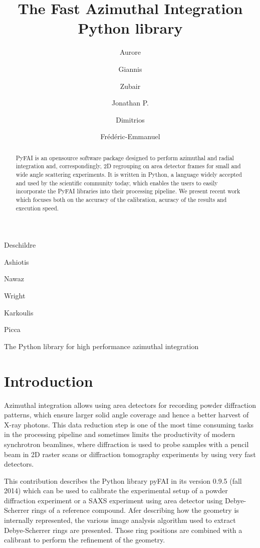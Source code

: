 \documentclass[preprint]{iucr}
\begin{document}
\title{The Fast Azimuthal Integration Python library}

    \author[a]{Aurore}{Deschildre}
    \author[a]{Giannis}{Ashiotis}
    \author[b]{Zubair}{Nawaz}
    \author[a]{Jonathan P.}{Wright}
    \author[a]{Dimitrios}{Karkoulis}
    \author[c]{Fr\'ed\'eric-Emmanuel}{Picca}

\maketitle

\begin{synopsis}
The Python library for high performance azimuthal integration 
\end{synopsis}

\begin{abstract}
PyFAI is an opensource software package designed to perform azimuthal and radial integration and,
correspondingly, 2D regrouping on area detector frames for small and wide
angle scattering experiments. 
It is written in Python, a
language widely accepted and used by the scientific community today, which enables the users to easily incorporate the PyFAI libraries into their processing pipeline. We present recent work
which focuses both on the accuracy of the calibration, acuracy of the results
and execution speed.
\end{abstract}

\section{Introduction}
Azimuthal integration allows using area detectors for recording powder
diffraction patterns, which  ensure larger solid angle coverage and hence a
better harvest of X­-ray photons.
This data reduction 
step is one of the most time ­consuming tasks in the processing pipeline and
sometimes limits the productivity of modern synchrotron beamlines, where
diffraction is used to probe samples with a  pencil beam in 2D raster scans or
diffraction tomography experiments by using very fast detectors. 

This contribution describes the Python library pyFAI in its version 0.9.5 (fall
2014) which can be used to calibrate the experimental setup of a powder
diffraction experiment or a SAXS experiment using area detector using
Debye-Scherrer rings of a reference compound. 
Afer describing how the geometry is internally represented, the various
image analysis algorithm used to extract Debye-Scherrer rings are presented.
Those ring positions are combined with a calibrant to perform the refinement
of the geometry.
\end{document}
